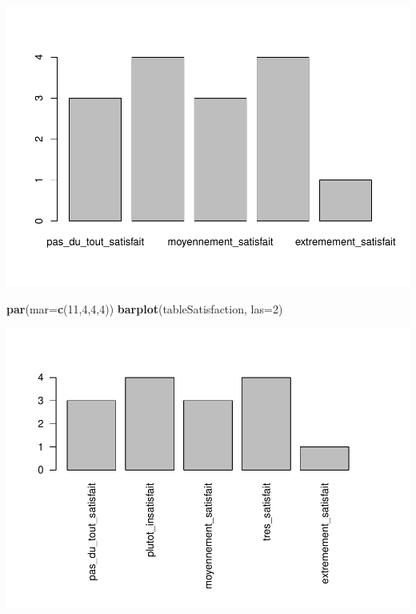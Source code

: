 \documentclass[
]{book}
\newenvironment{Shaded}{\begin{snugshade}}{\end{snugshade}}
\newcommand{\AttributeTok}[1]{\textcolor[rgb]{0.13,0.29,0.53}{#1}}
\newcommand{\DecValTok}[1]{\textcolor[rgb]{0.00,0.00,0.81}{#1}}
\newcommand{\FunctionTok}[1]{\textcolor[rgb]{0.13,0.29,0.53}{\textbf{#1}}}
\newcommand{\NormalTok}[1]{#1}
\newcommand{\OtherTok}[1]{\textcolor[rgb]{0.56,0.35,0.01}{#1}}
\newcommand{\SpecialCharTok}[1]{\textcolor[rgb]{0.81,0.36,0.00}{\textbf{#1}}}
\begin{document}
\begin{Shaded}
\end{Shaded}

\includegraphics{_main_files/figure-latex/unnamed-chunk-51-2.pdf}

\begin{Shaded}
\begin{Highlighting}[]
\FunctionTok{par}\NormalTok{(}\AttributeTok{mar=}\FunctionTok{c}\NormalTok{(}\DecValTok{11}\NormalTok{,}\DecValTok{4}\NormalTok{,}\DecValTok{4}\NormalTok{,}\DecValTok{4}\NormalTok{))}
\FunctionTok{barplot}\NormalTok{(tableSatisfaction, }\AttributeTok{las=}\DecValTok{2}\NormalTok{)}
\end{Highlighting}
\end{Shaded}

\includegraphics{_main_files/figure-latex/unnamed-chunk-51-3.pdf}
\end{document}
